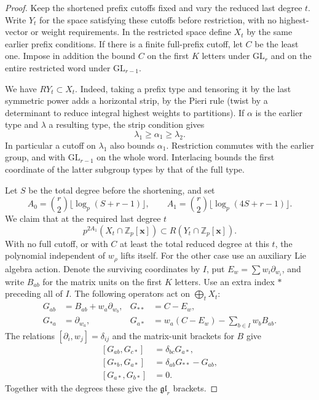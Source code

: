 \begin{proof}
Keep the shortened prefix cutoffs fixed and vary the reduced last
degree \(t\). Write \(Y_t\) for the space satisfying these cutoffs
before restriction, with no highest-vector or weight requirements.
In the restricted space define \(X_t\) by the same earlier prefix
conditions. If there is a finite full-prefix cutoff, let \(C\) be
the least one. Impose in addition the bound \(C\) on the first
\(K\) letters under \(\mathrm{GL}_r\) and on the entire restricted
word under \(\mathrm{GL}_{r-1}\).

We have \(RY_t\subset X_t\).
Indeed, taking a prefix type and tensoring it by the last symmetric
power adds a horizontal strip, by the Pieri rule (twist by a
determinant to reduce integral highest weights to partitions).
If \(\alpha\) is the earlier type and \(\lambda\) a resulting type, the strip condition gives
\[
 \lambda_1\ge\alpha_1\ge\lambda_2.
\]
In particular a cutoff on \(\lambda_1\) also bounds \(\alpha_1\). Restriction commutes with the earlier
group, and with \(\mathrm{GL}_{r-1}\) on the whole word.
Interlacing bounds the first coordinate of the latter subgroup
types by that of the full type.

Let \(S\) be the total degree before the shortening, and set
\[
 A_0=\binom r2\lfloor\log_p(S+r-1)\rfloor,\qquad
 A_1=\binom r2\lfloor\log_p(4S+r-1)\rfloor .
\]
We claim that at the required last degree \(t\)
\begin{equation}\label{eq:res-sat}
  p^{2A_1}(X_t\cap\mathbb Z_p[\mathbf x])
                  \subset R(Y_t\cap\mathbb Z_p[\mathbf x]).
\end{equation}
With no full cutoff, or with \(C\) at least the total reduced
degree at this \(t\), the polynomial independent of \(w_\rho\)
lifts itself. For the other case use an auxiliary Lie algebra action.
Denote the surviving coordinates by \(I\), put \(E_w=\sum w_i
\partial_{w_i}\), and write \(B_{ab}\) for the matrix units on
the first \(K\) letters. Use an extra index \(*\) preceding all
of \(I\). The following operators act on \(\bigoplus_t X_t\):
\begin{align*}
 G_{ab}&=B_{ab}+w_a\partial_{w_b},&
 G_{**}&=C-E_w,\\
 G_{*a}&=\partial_{w_a},&
 G_{a*}&=w_a(C-E_w)-\sum_{b\in I} w_b B_{ab}.
\end{align*}
The relations \([\partial_i,w_j]=\delta_{ij}\) and the matrix-unit brackets for \(B\) give
\[
 \begin{aligned} {}[G_{ab},G_{c*}]&=\delta_{bc}G_{a*},\\ {}[G_{*b},G_{a*}]&=\delta_{ab}G_{**}-G_{ab},\\ {}[G_{a*},G_{b*}]&=0.\end{aligned}
\]
Together with the degrees these give the
\(\mathfrak{gl}_r\) brackets.


\end{proof}

